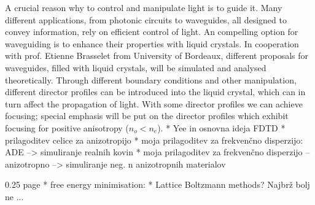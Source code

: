\documentclass[a4paper,10pt]{article}
\begin{document}
A crucial reason why to control and manipulate light is to guide it. 
Many different applications, from photonic circuits to waveguides, all designed to convey information, rely on efficient control of light. 
An compelling option for waveguiding is to enhance their properties with liquid crystals. 
In cooperation with prof. Etienne Brasselet from University of Bordeaux, different proposals for waveguides, filled with liquid crystals, will be simulated and analysed theoretically. 
Through different boundary conditions and other manipulation, different director profiles can be introduced into the liquid crystal, which can in turn affect the propagation of light. 
With some director profiles we can achieve focusing; special emphasis will be put on the director profiles which exhibit focusing for positive anisotropy ($n_{o} < n_e$).
% 
%
%
%
%
% 
% 
%
%
%
* Yee in osnovna ideja FDTD
* prilagoditev celice za anizotropijo
* moja prilagoditev za frekvenčno disperzijo: ADE --> simuliranje realnih kovin
* moja prilagoditev za frekvenčno disperzijo -- anizotropno --> simuliranje neg. n anizotropnih materialov

0.25 page
* free energy minimisation: 
* Lattice Boltzmann methods? Najbrž bolj ne ... 
% 
%
%
%
%
%
%



\end{document}
